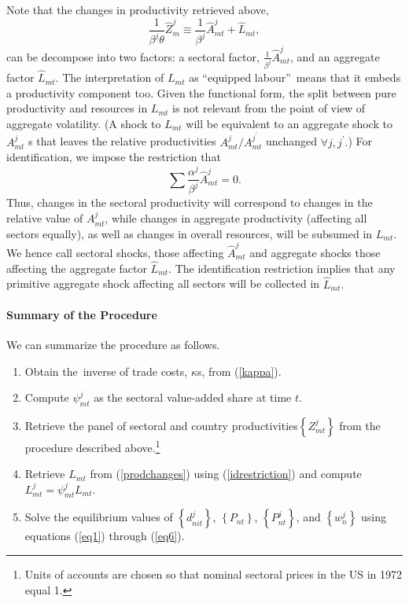 \documentclass[12pt]{article}
\begin{document}
Note that the changes in productivity retrieved above, 
\begin{equation}
\frac{1}{\beta ^{j}\theta }\hat{Z}_{m}^{j}\equiv \frac{1}{\beta ^{j}}\hat{A}%
_{mt}^{j}+\hat{L}_{mt},  \label{prodchanges}
\end{equation}%
can be decompose into two factors: a sectoral factor, $\frac{1}{\beta ^{j}}%
\hat{A}_{mt}^{j}$, and an aggregate factor $\hat{L}_{mt}$. The
interpretation of $L_{mt}$ as \textquotedblleft equipped
labour\textquotedblright\ means that it embeds a productivity component too.
Given the functional form, the split between pure productivity and resources
in $L_{mt}$ is not relevant from the point of view of aggregate volatility.
(A shock to $L_{mt}$ will be equivalent to an aggregate shock to $A_{mt}^{j}$%
s that leaves the relative productivities $A_{mt}^{j}/A_{mt}^{j^{\prime }}$
unchanged $\forall j,j^{\prime }.$) For identification, we impose the
restriction that 
\begin{equation}
\sum \frac{\alpha ^{j}}{\beta ^{j}}\hat{A}_{mt}^{j}=0.  \label{idrestriction}
\end{equation}%
Thus, changes in the sectoral productivity will correspond to changes in the
relative value of $A_{mt}^{j}$, while changes in aggregate productivity
(affecting all sectors equally), as well as changes in overall resources,
will be subsumed in $L_{mt}$. We hence call sectoral shocks, those affecting 
$\hat{A}_{mt}^{j}$ and aggregate shocks those affecting the aggregate factor 
$\hat{L}_{mt}$. The identification restriction implies that any primitive
aggregate shock affecting all sectors will be collected in $\hat{L}_{mt}.$

\paragraph{Summary of the Procedure}

We can summarize the procedure as follows.

\begin{enumerate}
\item Obtain the\ inverse of trade costs, $\kappa $s, from (\ref{kappa}).

\item Compute $\psi _{mt}^{j}$ as the sectoral value-added share at time $t$.

\item Retrieve the panel of sectoral and country productivities$\left\{
Z_{mt}^{j}\right\} $ from the procedure described above.\footnote{%
Units of accounts are chosen so that nominal sectoral prices in the US in
1972 equal 1.}

\item Retrieve $L_{mt}$ from (\ref{prodchanges}) using (\ref{idrestriction})
and compute $L_{mt}^{j}=\psi _{mt}^{j}L_{mt}.$

\item Solve the equilibrium values of $\left\{ d_{nit}^{j}\right\} $, $%
\left\{ P_{nt}\right\} $, $\left\{ P_{nt}^{j}\right\} $, and $\left\{
w_{n}^{j}\right\} $ using equations (\ref{eq1}) through (\ref{eq6}).
\end{enumerate}
\end{document}
